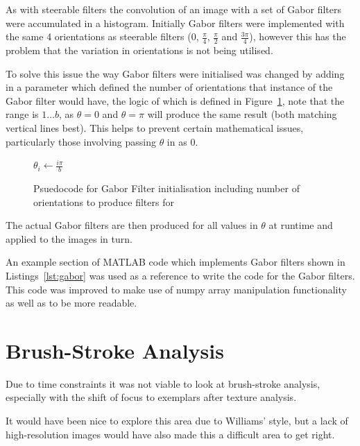 As with steerable filters the convolution of an image with a set of Gabor filters were accumulated in a histogram. Initially Gabor
filters were implemented with the same 4 orientations as steerable filters ($0$, $\frac{\pi}{4}$,
$\frac{\pi}{2}$ and $\frac{3\pi}{4}$), however this has the problem that the variation in orientations is not being utilised.

To solve this issue the way Gabor filters were initialised was changed by adding in a 
parameter which defined the number of orientations that instance of the Gabor filter would have,
the logic of which is defined in Figure~\ref{fig:gabor-init}, note that the range is $1\dots b$,
as $\theta=0$ and $\theta=\pi$ will produce the same result (both matching vertical lines best).
This helps to prevent certain mathematical issues, particularly those involving passing $\theta$
in as 0.

\begin{figure}[h]
\begin{algorithmic}
 
\State $\theta_i \gets \frac{i\pi}{b}$ 
\EndFor
\EndFunction
\end{algorithmic}
\caption[Psuedocode for Gabor Filter initialisation]{Psuedocode for Gabor Filter initialisation including number of orientations to produce 
filters for}\label{fig:gabor-init}
\end{figure}

The actual Gabor filters are then produced for all values in $\theta$ at runtime and applied to
the images in turn.

An example section of MATLAB code which implements Gabor filters shown in Listings~\ref{lst:gabor}
\cite{Yang2010Gabor} was used as a reference to write the code for the Gabor filters. This code
was improved to make use of numpy array manipulation functionality as well as to be more readable.


\section{Brush-Stroke Analysis}

Due to time constraints it was not viable to look at brush-stroke analysis, especially with the
shift of focus to exemplars after texture analysis.

It would have been nice to explore this area due to Williams' style, but a lack of high-resolution
images would have also made this a difficult area to get right.

